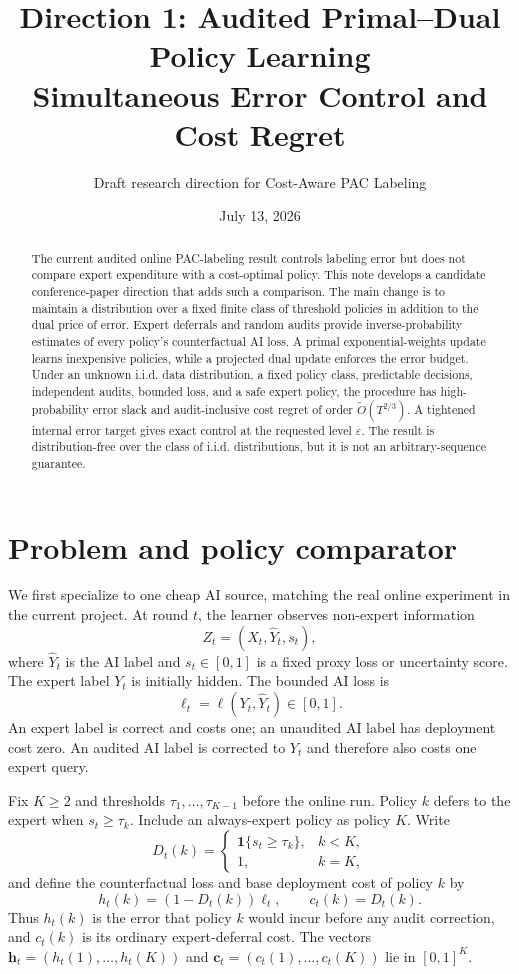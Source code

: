 \documentclass[11pt]{article}
\title{\textbf{Direction 1: Audited Primal--Dual Policy Learning}\\
\large Simultaneous Error Control and Cost Regret}
\author{Draft research direction for Cost-Aware PAC Labeling}
\date{July 13, 2026}
\newcommand{\ind}[1]{\mathbf{1}\{#1\}}
\newcommand{\eps}{\varepsilon}
\newcommand{\hvec}{\boldsymbol h}
\newcommand{\cvec}{\boldsymbol c}
\begin{document}
\maketitle

\begin{abstract}
The current audited online PAC-labeling result controls labeling error but does
not compare expert expenditure with a cost-optimal policy.  This note develops
a candidate conference-paper direction that adds such a comparison.  The main
change is to maintain a distribution over a fixed finite class of threshold
policies in addition to the dual price of error.  Expert deferrals and random
audits provide inverse-probability estimates of every policy's counterfactual
AI loss.  A primal exponential-weights update learns inexpensive policies,
while a projected dual update enforces the error budget.  Under an unknown
i.i.d. data distribution, a fixed policy class, predictable decisions,
independent audits, bounded loss, and a safe expert policy, the procedure has
high-probability error slack and audit-inclusive cost regret of order
$\widetilde O(T^{2/3})$.  A tightened internal error target gives exact control
at the requested level $\eps$.  The result is distribution-free over the class
of i.i.d. distributions, but it is not an arbitrary-sequence guarantee.
\end{abstract}

\section{Problem and policy comparator}

We first specialize to one cheap AI source, matching the real online
experiment in the current project.  At round $t$, the learner observes
non-expert information
\[
  Z_t=(X_t,\widehat Y_t,s_t),
\]
where $\widehat Y_t$ is the AI label and $s_t\in[0,1]$ is a fixed proxy loss or
uncertainty score.  The expert label $Y_t$ is initially hidden.  The bounded AI
loss is
\[
  \ell_t=\ell(Y_t,\widehat Y_t)\in[0,1].
\]
An expert label is correct and costs one; an unaudited AI label has deployment
cost zero.  An audited AI label is corrected to $Y_t$ and therefore also costs
one expert query.

Fix $K\ge2$ and thresholds $\tau_1,\ldots,\tau_{K-1}$ before the online run.  Policy $k$
defers to the expert when $s_t\ge \tau_k$.  Include an always-expert policy as
policy $K$.  Write
\[
  D_t(k)=
  \begin{cases}
    \ind{s_t\ge\tau_k},&k<K,\\
    1,&k=K,
  \end{cases}
\]
and define the counterfactual loss and base deployment cost of policy $k$ by
\begin{equation}
  h_t(k)=(1-D_t(k))\ell_t,
  \qquad
  c_t(k)=D_t(k).
  \label{eq:round-loss-cost}
\end{equation}
Thus $h_t(k)$ is the error that policy $k$ would incur before any audit
correction, and $c_t(k)$ is its ordinary expert-deferral cost.  The vectors
$\hvec_t=(h_t(1),\ldots,h_t(K))$ and
$\cvec_t=(c_t(1),\ldots,c_t(K))$ lie in $[0,1]^K$.
\end{document}
